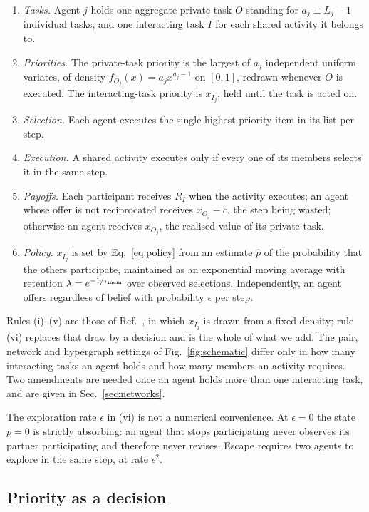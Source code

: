 \documentclass[aps,pre,twocolumn,superscriptaddress,floatfix,longbibliography]{revtex4-2}
\begin{document}
\begin{enumerate}
\item[(i)] \emph{Tasks.} Agent $j$ holds one aggregate private task $O$ standing
for $a_j\equiv L_j-1$ individual tasks, and one interacting task $I$ for each
shared activity it belongs to.
\item[(ii)] \emph{Priorities.} The private-task priority is the largest of $a_j$
independent uniform variates, of density $f_{O_j}(x)=a_j x^{a_j-1}$ on $[0,1]$,
redrawn whenever $O$ is executed. The interacting-task priority is $x_{I_j}$,
held until the task is acted on.
\item[(iii)] \emph{Selection.} Each agent executes the single highest-priority
item in its list per step.
\item[(iv)] \emph{Execution.} A shared activity executes only if every one of
its members selects it in the same step.
\item[(v)] \emph{Payoffs.} Each participant receives $R_I$ when the activity
executes; an agent whose offer is not reciprocated receives $x_{O_j}-c$, the
step being wasted; otherwise an agent receives $x_{O_j}$, the realised value of
its private task.
\item[(vi)] \emph{Policy.} $x_{I_j}$ is set by Eq.~\eqref{eq:policy} from an
estimate $\hat p$ of the probability that the others participate, maintained as
an exponential moving average with retention $\lambda=e^{-1/\tau_{\rm mem}}$
over observed selections. Independently, an agent offers regardless of belief
with probability $\epsilon$ per step.
\end{enumerate}

Rules (i)--(v) are those of Ref.~\cite{oliveira2009}, in which $x_{I_j}$ is
drawn from a fixed density; rule (vi) replaces that draw by a decision and is
the whole of what we add. The pair, network and hypergraph settings of
Fig.~\ref{fig:schematic} differ only in how many interacting tasks an agent
holds and how many members an activity requires. Two amendments are needed once
an agent holds more than one interacting task, and are given in
Sec.~\ref{sec:networks}.

The exploration rate $\epsilon$ in (vi) is not a numerical convenience. At
$\epsilon=0$ the state $p=0$ is strictly absorbing: an agent that stops
participating never observes its partner participating and therefore never
revises. Escape requires two agents to explore in the same step, at rate
$\epsilon^2$.

\subsection{Priority as a decision}
\end{document}
